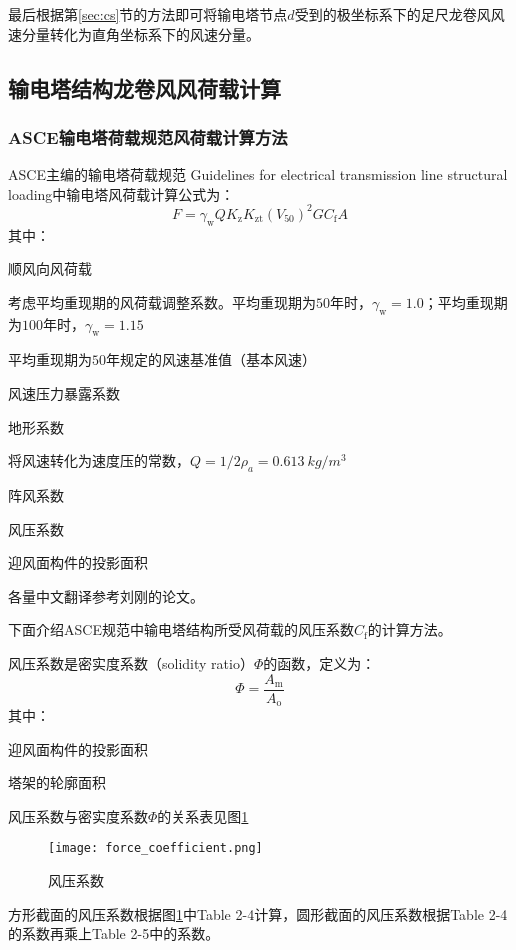 最后根据第\ref{sec:cs}节的方法即可将输电塔节点$d$受到的极坐标系下的足尺龙卷风风速分量转化为直角坐标系下的风速分量。


\subsection{输电塔结构龙卷风风荷载计算}

\subsubsection{ASCE输电塔荷载规范风荷载计算方法}
ASCE主编的输电塔荷载规范 Guidelines for electrical transmission line structural loading\cite{wong2009guidelines}中输电塔风荷载计算公式为：
\begin{equation}
	F = \gamma_{\mathrm{w}} Q K_{\mathrm{z}} K_{\mathrm{zt}} \left( V_{50}\right)^2 G C_{\mathrm{f}} A
\end{equation}
其中：
\begin{description}[leftmargin=!,labelwidth=2em]
	\item[$F$] 顺风向风荷载
	\item[$\gamma_{\mathrm{w}}$] 考虑平均重现期的风荷载调整系数。平均重现期为$50$年时，$\gamma_{\mathrm{w}}=1.0$；平均重现期为$100$年时，$\gamma_{\mathrm{w}}=1.15$
	\item[$V_{50}$] 平均重现期为$50$年规定的风速基准值（基本风速）
	\item[$K_{\mathrm{z}}$] 风速压力暴露系数
	\item[$K_{\mathrm{zt}}$] 地形系数
	\item[$Q$] 将风速转化为速度压的常数，$Q=1/2 \rho_a=\SI{0.613}{kg/m^3}$
	\item[$G$] 阵风系数
	\item[$C_{\mathrm{f}}$] 风压系数
	\item[$A$] 迎风面构件的投影面积
\end{description}
各量中文翻译参考刘刚的论文\cite{liu2010wind}。

下面介绍ASCE规范中输电塔结构所受风荷载的风压系数$C_{\mathrm{f}}$的计算方法。

风压系数是密实度系数（solidity ratio）$\Phi$的函数，定义为：
\begin{equation}
	\Phi = \frac{A_\mathrm{m}}{A_\mathrm{o}}
\end{equation}
其中：
\begin{description}[leftmargin=!,labelwidth=2em]
	\item[$A_\mathrm{m}$] 迎风面构件的投影面积
	\item[$A_\mathrm{o}$] 塔架的轮廓面积
\end{description}
风压系数与密实度系数$\Phi$的关系表见图\ref{fig:force-coefficient}\cite{wong2009guidelines}
\begin{figure}[!htbp]
	\centering
	\texttt{[image: force\_coefficient.png]}
	\caption{风压系数}\label{fig:force-coefficient}
\end{figure}
方形截面的风压系数根据图\ref{fig:force-coefficient}中Table 2-4计算，圆形截面的风压系数根据Table 2-4的系数再乘上Table 2-5中的系数。


